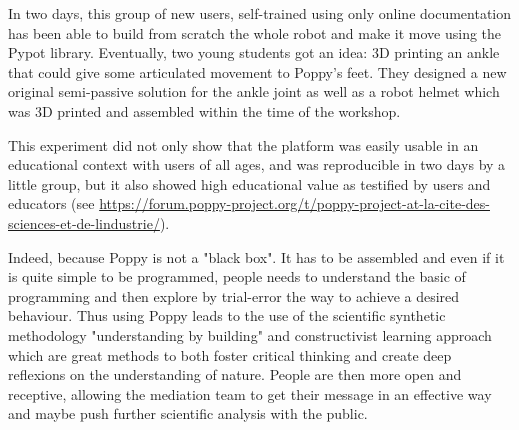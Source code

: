 \begin{figure}[]
\centering
    \hfil
    \hfil
    \caption{}
    \label{fig:universience_conception}
\end{figure}

In two days, this group of new users, self-trained using only online documentation has been able to build from scratch the whole robot and make it move using the Pypot library. Eventually, two young students got an idea: 3D printing an ankle that could give some articulated movement to Poppy's feet. They designed a new original semi-passive solution for the ankle joint as well as a robot helmet which was 3D printed and assembled within the time of the workshop.

\begin{figure}[]
\centering
    \hfil
    \newline
    \hfil
    \caption{}
    \label{fig:universience_assembly}
\end{figure}

\begin{figure}[]
\centering
    \hfil
    \caption{}
    \label{fig:universience_conception}
\end{figure}

This experiment did not only show that the platform was easily usable in an educational context with users of all ages, and was reproducible in two days by a little group, but it also showed high educational value as testified by users and educators (see \url{https://forum.poppy-project.org/t/poppy-project-at-la-cite-des-sciences-et-de-lindustrie/}).

Indeed, because Poppy is not a "black box". It has to be assembled and even if it is quite simple to be programmed, people needs to understand the basic of programming and then explore by trial-error the way to achieve a desired behaviour. Thus using Poppy leads to the use of the scientific synthetic methodology "understanding by building" and constructivist learning approach which are great methods to both foster critical thinking and create deep reflexions on the understanding of nature. People are then more open and receptive, allowing the mediation team to get their message in an effective way and maybe push further scientific analysis with the public.


